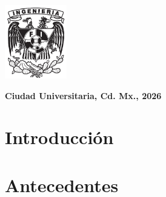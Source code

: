 \documentclass[12pt,twoside]{report}
\begin{document}
\vspace{2cm}

\begin{minipage}[t]{4cm}
  \includegraphics[height=3.2cm]{images/escudofi_negro.jpg}
\end{minipage}
\hspace{5cm}
\begin{minipage}[t]{9cm}
  \raggedleft
  \textbf{Ciudad Universitaria, Cd. Mx., 2026}
\end{minipage}

\restoregeometry
\newpage
\tableofcontents

\chapter{Introducci\'on}


\chapter{Antecedentes}




\end{document}
